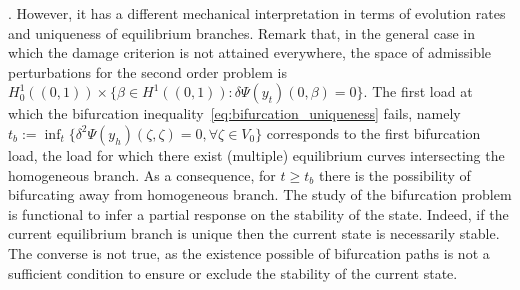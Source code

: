 . However, it has a different mechanical interpretation in terms of evolution rates and uniqueness of equilibrium branches.
Remark that, in the general case in which the damage criterion is not attained everywhere, the space of admissible perturbations for the second order problem is $H^1_0((0, 1)) \times \{ \beta \in H^1((0, 1)) : \delta\Psi(y_t)(0, \beta) = 0 \}$. 
The first load at which the bifurcation inequality~\eqref{eq:bifurcation_uniqueness} fails, namely $t_b:=\inf_t \{\delta^2 \Psi(y_h)(\zeta, \zeta) =0, \forall \zeta \in V_0 \}$ corresponds to the first  bifurcation load, the load for which there exist (multiple) equilibrium curves intersecting the homogeneous branch. As a consequence, for $t\geq t_b$ there is the possibility of bifurcating away from homogeneous branch. The study of the bifurcation problem is functional to infer a partial response on the stability of the state. Indeed, if the current equilibrium branch is unique then the current state is necessarily stable. The converse is not true, as the existence  possible of bifurcation paths is not a sufficient condition to ensure or exclude the stability of the current state.


